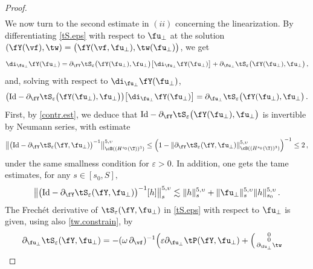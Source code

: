 \documentclass[a4paper,reqno,10pt]{article}
\newcommand{\pa}{\partial}
\begin{document}
\begin{proof}
\begin{align*}
	\end{align*}
   We now turn to the second estimate in $(ii)$ concerning the linearization.
     By differentiating \eqref{tS.eps} with respect to $\fu_{\perp}$ at the solution $(\fY(\vf),\tw)=\big( \fY(\vf,\fu_{\perp}), \tw(\fu_{\perp}) \big)$, we get
\begin{equation}
	\di_{\fu_{\perp}} \fY(\fu_{\perp}) =  \pa_{\fY}\tS_{\varepsilon}\big(\fY(\fu_{\perp}),\fu_{\perp}\big) \big[ \di_{\fu_{\perp}}\fY(\fu_{\perp}) \big] + \pa_{\fu_{\perp}} \tS_{\varepsilon}\big(\fY(\fu_{\perp}),\fu_{\perp}\big) \,,
\end{equation}
and, solving with respect to $\di_{\fu_{\perp}} \fY(\fu_{\perp})$,
\begin{equation}\label{night.eps}
	\big( {\rm Id} - \pa_{\fY}\tS_{\varepsilon}\big(\fY(\fu_{\perp}),\fu_{\perp}\big) \big)\big[ \di_{\fu_{\perp}}\fY(\fu_{\perp}) \big]  = \pa_{\fu_{\perp}} \tS_{\varepsilon}\big(\fY(\fu_{\perp}),\fu_{\perp}\big) \,.
\end{equation}
   First, by \eqref{contr.est}, we deduce that  $ {\rm Id} - \pa_{\fY}\tS_{\varepsilon}\big(\fY(\fu_{\perp}),\fu_{\perp}\big) $ is invertible by Neumann series, with estimate
   \begin{equation*}%
   		\big\| \big( {\rm Id} -\pa_{\fY} \tS_{\varepsilon}(\fY,\fu_{\perp})\big)^{-1} \big\|_{\cB((H^{s_0}(\T))^3)}^{5,\upsilon} \leq \Big( 1 - 	\| \pa_{\fY} \tS_{\varepsilon}(\fY,\fu_{\perp}) \|_{\cB((H^{s_0}(\T))^3)}^{5,\upsilon} \Big)^{-1} \leq 2 \,,
   \end{equation*}
   under the same smallness condition for $\varepsilon>0$. In addition, one gets the tame estimates, for any $s\in[s_0,S],$
   \begin{equation}\label{nightL2.eps}
   		\big\| \big( {\rm Id} -\pa_{\fY} \tS_{\varepsilon}(\fY,\fu_{\perp})\big)^{-1}[h] \big\|_{s}^{5,\upsilon} \lesssim  \| h \|_{s}^{5,\upsilon}+ \| \fu_{\perp}\|_{s}^{5,\upsilon} \| h \|_{s_0}^{5,\upsilon} \,.
   \end{equation}
   The Frech\'et derivative of $\tS_{\varepsilon}(\fY,\fu_{\perp})$ in \eqref{tS.eps} with respect to $\fu_{\perp}$ is given, using also \eqref{tw.constrain}, by
   \begin{align}
   	\pa_{\fu_{\perp}} \tS_{\varepsilon}(\fY,\fu_{\perp}) & =  - (\omega\,\pa_{\vf})^{-1} \Big( \varepsilon \pa_{\fu_{\perp}}\tP(\fY,\fu_{\perp}) + \Big(\begin{smallmatrix}
   		0  \\ 0 \\ \pa_{\fu_{\perp}}\tw

\end{smallmatrix}
\end{align}
\end{proof}
\end{document}
